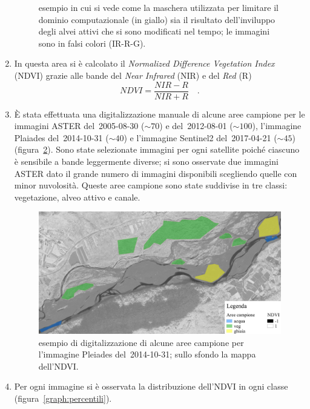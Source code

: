 \documentclass[12pt,a4paper]{article}
\begin{document}
\begin{enumerate}
\begin{figure}[ht]
			{esempio in cui si vede come la maschera utilizzata per limitare il dominio computazionale (in giallo) sia il risultato dell'inviluppo degli alvei attivi che si sono modificati nel tempo; le immagini sono in falsi colori (IR-R-G).}
		\label{fig:esempio-maschera}
	\end{figure}
	\item In questa area si è calcolato il \emph{Normalized Difference Vegetation Index} (NDVI) grazie alle bande del \emph{Near Infrared} (NIR) e del \emph{Red} (R)
	\begin{equation}
		NDVI = \frac{NIR - R}{NIR + R} \quad .
		\label{eq:ndvi}
	\end{equation}
	\item \`{E} stata effettuata una digitalizzazione manuale di alcune aree campione per le immagini ASTER del~2005-08-30 ($\sim 70$) e del~2012-08-01 ($\sim 100$), l'immagine Plaiades del~2014-10-31 ($\sim 40$) e l'immagine Sentinel2 del~2017-04-21 ($\sim 45$) (figura~\ref{fig:esempio-aree-campione}).
	Sono state selezionate immagini per ogni satellite poiché ciascuno è sensibile a bande leggermente diverse; si sono osservate due immagini ASTER dato il grande numero di immagini disponibili scegliendo quelle con minor nuvolosità.
	Queste aree campione sono state suddivise in tre classi: vegetazione, alveo attivo e canale.
	\begin{figure}[ht]
		\centering
		\includegraphics[width=\textwidth]{files/esempio_aree_campione_2014_10_31.jpeg}
		\caption[esempio di aree campione per calcolare la distribuzione dell'NDVI]{esempio di digitalizzazione di alcune aree campione per l'immagine Pleiades del~2014-10-31; sullo sfondo la mappa dell'NDVI.}
		\label{fig:esempio-aree-campione}
	\end{figure}
	\item Per ogni immagine si è osservata la distribuzione dell'NDVI in ogni classe (figura~\ref{graph:percentili}).

\end{enumerate}
\end{document}
